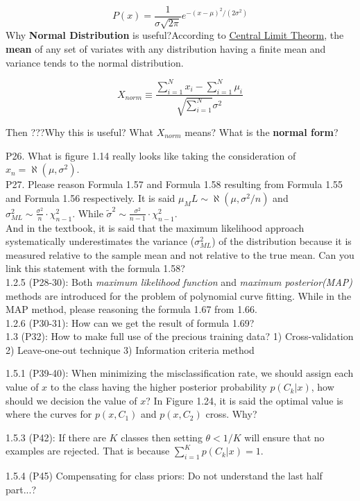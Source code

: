 \documentclass[12pt]{article}
\begin{document}
\begin{equation}
	P(x) = \frac{1}{\sigma\sqrt{2\pi}}e^{-(x-\mu)^2/(2\sigma^2)}
\end{equation}
Why \textbf{Normal Distribution} is useful?According to \href{http://mathworld.wolfram.com/CentralLimitTheorem.html}{Central Limit Theorm}, the \textbf{mean} of any set of variates with any distribution having a finite mean and variance tends to the normal distribution. 

\begin{equation}
X_{norm}\equiv\frac{\sum_{i=1}^Nx_{i}-\sum_{i=1}^N\mu_{i}}{\sqrt{\sum_{i=1}^N}\sigma^2}
\end{equation}

Then ???Why this is useful? What $X_{norm}$ means? What is the \textbf{normal form}?


P26. What is figure 1.14 really looks like taking the consideration of $x_n=\aleph(\mu, \sigma^2)$. \\

P27. Please reason Formula 1.57 and Formula 1.58 resulting
from Formula 1.55 and Formula 1.56 respectively.
It is said $\mu_ML \sim \aleph(\mu, \sigma^2/n)$ and
$\sigma^2_{ML} \sim \frac{\sigma^2}{n}\cdot \chi^2_{n-1}$.
While $\widetilde{\sigma}^2 \sim \frac{\sigma^2}{n-1}\cdot \chi^2_{n-1}$.\\
And in the textbook, it is said that the maximum likelihood
approach systematically underestimates the variance
($\sigma^2_{ML}$) of the distribution because it is
measured relative to the sample mean and not relative
to the true mean. Can you link this statement with
the formula 1.58?\\

1.2.5 (P28-30): Both \emph{maximum likelihood function}
and \emph{maximum posterior(MAP)} methods are introduced
for the problem of polynomial curve fitting. While
in the MAP method, please reasoning the formula 1.67
from 1.66.\\

1.2.6 (P30-31): How can we get the result of formula 1.69?\\

1.3 (P32): How to make full use of the precious training data?
1) Cross-validation
2) Leave-one-out technique
3) Information criteria method

1.5.1 (P39-40): When minimizing the misclassification rate,
we should assign each value of $x$ to the class having
the higher posterior probability $p(C_k|x)$, how should
we decision the value of $x$? In Figure 1.24, it is said
the optimal value is where the curves for $p(x, C_1)$
and $p(x, C_2)$ cross. Why?

1.5.3 (P42): If there are $K$ classes then setting $\theta < 1/ K$
will ensure that no examples are rejected. That is because
$\sum^K_{i=1}p(C_k|x)=1$.

1.5.4 (P45) Compensating for class priors: Do not understand the
last half part...?
\end{document}
